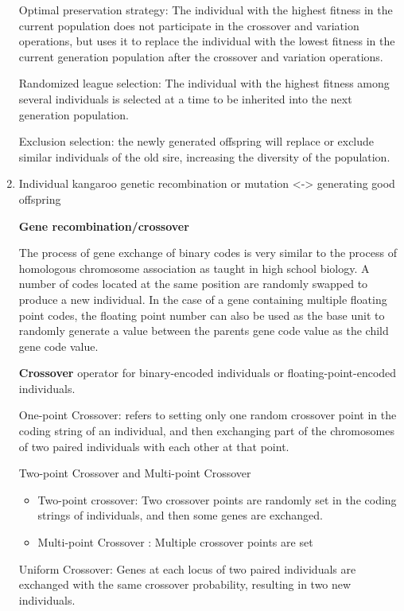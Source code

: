 \documentclass[twocolumn]{article}
\begin{document}
\begin{enumerate}
		Optimal preservation strategy: The individual with the highest
		fitness in the current population does not participate in the
		crossover and variation operations, but uses it to replace the
		individual with the lowest fitness in the current generation
		population after the crossover and variation operations.
	
		Randomized league selection: The individual with the highest fitness
		among several individuals is selected at a time to be inherited into
		the next generation population.
		
		Exclusion selection: the newly generated offspring will replace or
		exclude similar individuals of the old sire, increasing the
		diversity of the population.

	\item
	Individual kangaroo genetic recombination or mutation
	\textless-\textgreater{} generating good offspring
	
	\textbf{Gene recombination/crossover}
	
	The process of gene exchange of binary codes is very similar to the
	process of homologous chromosome association as taught in high school
	biology. A number of codes located at the same position are randomly
	swapped to produce a new individual. In the case of a gene containing
	multiple floating point codes, the floating point number can also be
	used as the base unit to randomly generate a value between the parents
	gene code value as the child gene code value.
	
	\textbf{Crossover} operator for binary-encoded individuals or
	floating-point-encoded individuals.
	

		One-point Crossover: refers to setting only one random crossover
		point in the coding string of an individual, and then exchanging
		part of the chromosomes of two paired individuals with each other at
		that point.

		Two-point Crossover and Multi-point Crossover
		
		\begin{itemize}
			\item
			Two-point crossover: Two crossover points are randomly set in the
			coding strings of individuals, and then some genes are exchanged.
			\item
			Multi-point Crossover : Multiple crossover points are set
		\end{itemize}
	
		Uniform Crossover: Genes at each locus of two paired individuals are
		exchanged with the same crossover probability, resulting in two new
		individuals.
	

\end{enumerate}
\end{document}
